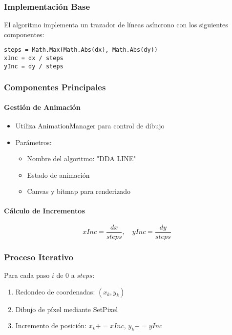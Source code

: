 \documentclass[12pt]{article}
\begin{document}
\subsubsection{Implementación Base}
El algoritmo implementa un trazador de líneas asíncrono con los siguientes componentes:

\begin{lstlisting}
steps = Math.Max(Math.Abs(dx), Math.Abs(dy))
xInc = dx / steps
yInc = dy / steps
\end{lstlisting}

\subsubsection{Componentes Principales}
\paragraph{Gestión de Animación}
\begin{itemize}
    \item Utiliza AnimationManager para control de dibujo
    \item Parámetros:
    \begin{itemize}
        \item Nombre del algoritmo: "DDA LINE"
        \item Estado de animación
        \item Canvas y bitmap para renderizado
    \end{itemize}
\end{itemize}

\paragraph{Cálculo de Incrementos}
\begin{equation}
    xInc = \frac{dx}{steps}, \quad yInc = \frac{dy}{steps}
\end{equation}

\subsubsection{Proceso Iterativo}
Para cada paso $i$ de 0 a $steps$:
\begin{enumerate}
    \item Redondeo de coordenadas: $(x_k, y_k)$
    \item Dibujo de píxel mediante SetPixel
    \item Incremento de posición: $x_k += xInc$, $y_k += yInc$
\end{enumerate}
\end{document}
